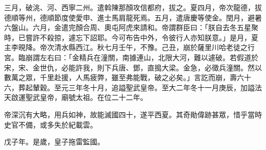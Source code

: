 \begin{pinyinscope}
 三月，破洮、河、西寧二州。遣斡陳那顏攻信都府，拔之。夏四月，帝次龍德，拔德順等州，德順節度使愛申、進士馬肩龍死焉。五月，遣唐慶等使金。閏月，避暑六盤山。六月，金遣完顏合周、奧屯阿虎來請和。帝謂群臣曰：「朕自去冬五星聚時，已嘗許不殺掠，遽忘下詔耶。今可布告中外，令彼行人亦知朕意。」是月，夏主李晛降。帝次清水縣西江。秋七月壬午，不豫。己丑，崩於薩里川哈老徒之行宮。臨崩謂左右曰：「金精兵在潼關，南據連山，北限大河，難以遽破。若假道於宋，宋、金世仇，必能許我，則下兵唐、鄧，直搗大梁。金急，必徵兵潼關。然以數萬之眾，千里赴援，人馬疲弊，雖至弗能戰，破之必矣。」言訖而崩，壽六十六，葬起輦穀。至元三年冬十月，追謚聖武皇帝。至大二年冬十一月庚辰，加謚法天啟運聖武皇帝，廟號太祖。在位二十二年。



 帝深沉有大略，用兵如神，故能滅國四十，遂平西夏。其奇勛偉跡甚眾，惜乎當時史官不備，或多失於紀載雲。



 戊子年。是歲，皇子拖雷監國。



\end{pinyinscope}